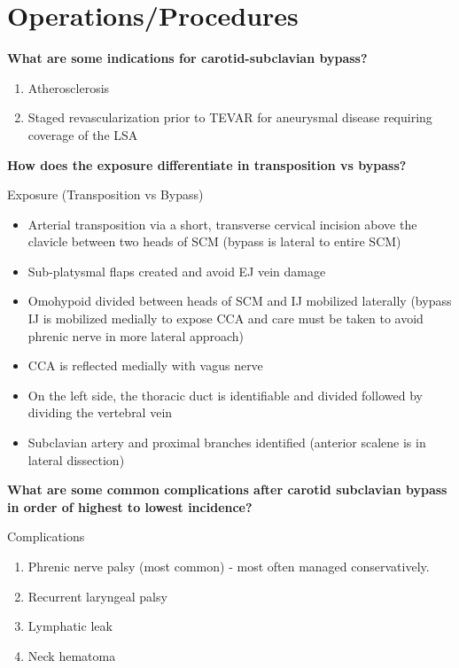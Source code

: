 \documentclass[
]{book}
\begin{document}
\hypertarget{operationsprocedures}{%
\section{Operations/Procedures}\label{operationsprocedures}}

\textbf{What are some indications for carotid-subclavian bypass?}

\begin{enumerate}
\def\labelenumi{\arabic{enumi}.}
\item
  Atherosclerosis~
\item
  Staged revascularization prior to TEVAR for aneurysmal disease
  requiring coverage of the LSA
\end{enumerate}

\textbf{How does the exposure differentiate in transposition vs bypass?}

Exposure (Transposition vs Bypass)

\begin{itemize}
\item
  Arterial transposition via a short, transverse cervical incision
  above the clavicle between two heads of SCM (bypass is lateral to
  entire SCM)
\item
  Sub-platysmal flaps created and avoid EJ vein damage
\item
  Omohypoid divided between heads of SCM and IJ mobilized laterally
  (bypass IJ is mobilized medially to expose CCA and care must be
  taken to avoid phrenic nerve in more lateral approach)
\item
  CCA is reflected medially with vagus nerve~
\item
  On the left side, the thoracic duct is identifiable and divided
  followed by dividing the vertebral vein
\item
  Subclavian artery and proximal branches identified (anterior scalene
  is in lateral dissection)
\end{itemize}

\textbf{What are some common complications after carotid subclavian bypass in
order of highest to lowest incidence?}

Complications \citep{voigtOutcomesCarotidsubclavianBypass2019}

\begin{enumerate}
\def\labelenumi{\arabic{enumi}.}
\item
  Phrenic nerve palsy (most common) - most often managed
  conservatively.
\item
  Recurrent laryngeal palsy
\item
  Lymphatic leak
\item
  Neck hematoma
\end{enumerate}
\end{document}
